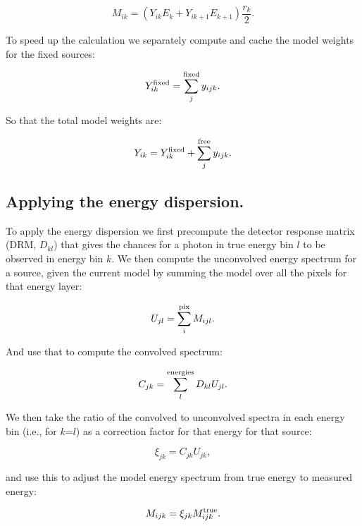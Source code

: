 \documentclass[preprint]{aastex}
\begin{document}
\begin{equation}
  M_{ik} = (Y_{ik} E_k +  Y_{ik+1} E_{k+1}) \frac{r_k}{2}.
\end{equation}

\noindent To speed up the calculation we separately compute and cache
the model weights for the fixed sources:

\begin{equation}
  Y_{ik}^{\rm fixed} = \sum_j^{\rm fixed} y_{ijk}.
\end{equation}

\noindent So that the total model weights are:

\begin{equation}
  Y_{ik} = Y_{ik}^{\rm fixed} + \sum_j^{\rm free} y_{ijk}.
\end{equation}


\subsection{Applying the energy dispersion.}\label{subsec:like_model_edisp}

To apply the energy dispersion we first precompute the detector
response matrix (DRM, $D_{kl}$) that gives the chances for a photon in
true energy bin $l$ to be observed in energy bin $k$.  We then compute
the unconvolved energy spectrum for a source, given the current model
by summing the model over all the pixels for that energy layer:

\begin{equation}
  U_{jl} = \sum_i^{\rm pix} M_{ijl}.
\end{equation}

\noindent And use that to compute the convolved spectrum:

\begin{equation}
  C_{jk} = \sum_l^{\rm energies} D_{kl} U_{jl}.
\end{equation}

\noindent We then take the ratio of the convolved to unconvolved
spectra in each energy bin (i.e., for $k$=$l$) as a correction factor
for that energy for that source:

\begin{equation}
  \xi_{jk} = C_{jk} U_{jk},
\end{equation}

\noindent and use this to adjust the model energy spectrum from true
energy to measured energy:

\begin{equation}
  M_{ijk} = \xi_{jk} M_{ijk}^{\rm true}.
\end{equation}
\end{document}
